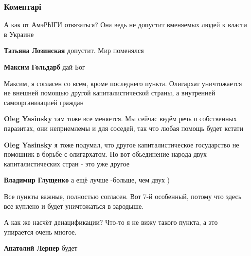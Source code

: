  
 
 
 
 
\subsubsection{Коментарі}
\label{sec:13_10_2021.fb.goldarb_maksim.1.ukraina_rossia.cmt}

\begin{itemize} %
А как от АмэРЫГИ отвязаться? Она ведь не допустит вменяемых людей к власти в Украине

\begin{itemize} %
\textbf{Татьяна Лозинская} допустит. Мир поменялся

\textbf{Максим Гольдарб} дай Бог
\end{itemize} %


Максим, я согласен со всем, кроме последнего пункта. Олигархат уничтожается не
внешней помощью другой капиталистической страны, а внутренней самоорганизацией
граждан

\begin{itemize} %
\textbf{Oleg Yasinsky} там тоже все меняется. Мы сейчас ведём речь о собственных паразитах, они неприемлемы и для соседей, так что любая помощь будет кстати

\textbf{Oleg Yasinsky} я тоже подумал, что другое капиталистическое государство не помошник в борьбе с олигархатом. Но вот обьединение народа двух капиталистических стран - это уже другое

\textbf{Владимир Глущенко} а ещё лучше -больше, чем двух )
\end{itemize} %

Все пункты важные, полностью согласен. Вот 7-й особенный, потому что здесь все куплено и будет уничтожаться в зародыше.

А как же насчёт денацификации? Что-то я не вижу такого пункта, а это упирается очень многое.

\begin{itemize} %
\textbf{Анатолий Лернер} будет


\end{itemize}
\end{itemize}
